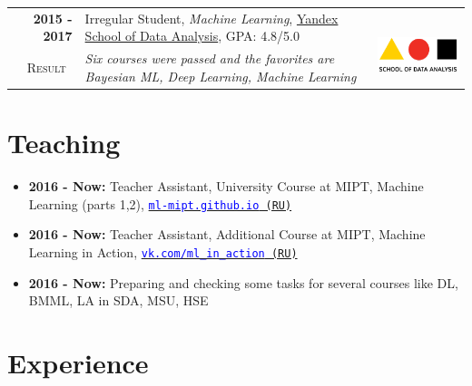 \documentclass[a4paper,10pt]{article} %
\begin{document}
\begin{tabular}{rp{14cm}c}	
\textbf{2015 -  2017} & Irregular Student, \emph{Machine Learning}, \href{https://yandexdataschool.com/}{Yandex School of Data Analysis}, GPA: 4.8/5.0& \multirow{2}{*}{~~\includegraphics[scale=0.25]{img/shad}}\\
\textsc{Result}~& \emph{Six courses were passed and the favorites are Bayesian ML, Deep Learning, Machine Learning}
\end{tabular}

\section{Teaching}
\begin{itemize}
	\item \textbf{2016 - Now:} Teacher Assistant, University Course at MIPT, Machine Learning (parts 1,2), \href{https://ml-mipt.github.io/}{\texttt{\textcolor{blue}{ml-mipt.github.io} (RU)}}
	\item \textbf{2016 - Now:} Teacher Assistant, Additional Course at MIPT, Machine Learning in Action, \href{https://vk.com/data_mining_in_action}{\texttt{\textcolor{blue}{vk.com/ml\_in\_action} (RU)}}
	\item \textbf{2016 - Now:} Preparing and checking some tasks for several courses like DL, BMML, LA in SDA, MSU, HSE
\end{itemize}

\section{Experience}
\end{document}

